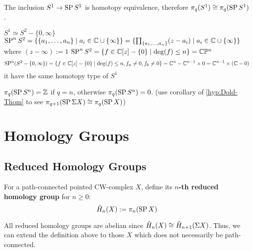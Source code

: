     \begin{prop}
        The inclusion $S^1 \to \operatorname{SP} S^1$ is homotopy equivalence,
        therefore $\pi_q(S^1) \cong \pi_q(\operatorname{SP} S^1)$.
    \end{prop}
    \begin{prf}
        $S^1 \simeq S^2 - \{0,\infty\}$\\
        $\operatorname{SP}^n S^2 = \{\{a_1,\dots, a_n\} \mid a_i \in \mathbb C \cup \{\infty\}\} = \{\prod_{\{a_1,\dots, a_n\}} (z-a_i) \mid a_i \in \mathbb C \cup \{\infty\} \}$
        where $(z - \infty) := 1$
        $\operatorname{SP}^n S^2 = \{f \in \mathbb C [z] - \{ 0 \} \mid \deg(f) \leq n \} = \mathbb C \mathbb P ^n$\\
        $$
        \operatorname{SP}^n (S^2 - \{0,\infty\}) = \{f \in \mathbb C [z] - \{ 0 \} \mid \deg(f) \leq n, f_n \neq 0, f_0 \neq 0 \} = 
        \mathbb C^n - \mathbb C^{n-1} \times 0 = \mathbb C^{n-1} \times (\mathbb C - 0)
        $$
        it have the same homotopy type of $S^1$
    \end{prf}

    \begin{cor}
        \label{hyp:SP-Sn-is-K(Z,n)}
        $\pi_q(\operatorname{SP} S^n) = \mathbb Z $ if $q = n$, otherwise $\pi_q(\operatorname{SP} S^n) = 0$.
        (use corollary of \ref{hyp:Dold-Thom} to see $\pi_{q+1}(\operatorname{SP} \Sigma X) \cong \pi_q (\operatorname{SP} X)$)
    \end{cor}


    \section{Homology Groups}

    \subsection{Reduced Homology Groups}

    \begin{defn}
        For a path-connected pointed CW-complex $X$,
        define its \textbf{$n$-th reduced homology group} for $n \geq 0$:\\
        $$
        \tilde{H}_n(X) := \pi_n(\operatorname{SP} X)
        $$
    \end{defn}

    \begin{note}
        All reduced homology groups are abelian since
        $\tilde{H}_n(X) \cong \tilde{H}_{n+1}(\Sigma X)$.
        Thus, we can extend the definition above
        to those $X$ which does not necessarily be path-connected.\\
    \end{note}

